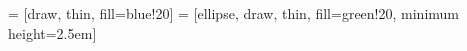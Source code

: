 
\subtitle{\large Parte I: Primeros pasos}
\usetikzlibrary{arrows,shapes}
 = [draw, thin, fill=blue!20]
 = [ellipse, draw, thin, fill=green!20, minimum height=2.5em]












